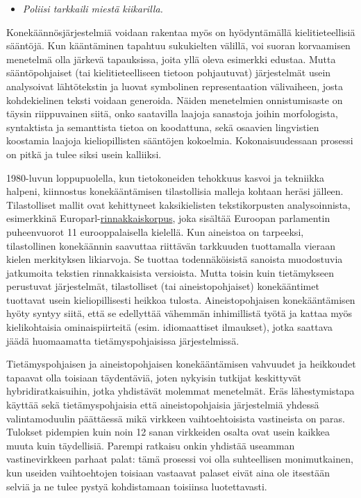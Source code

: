 \documentclass[]{../../metanetpaper}
\begin{document}
\begin{Parallel}[c]{70mm}{70mm}
{\begin{itemize}
\item[] \textit{Poliisi tarkkaili miestä kiikarilla.}
\end{itemize}

Konekäännösjärjestelmiä voidaan rakentaa myös on hyödyntämällä
kielitieteellisiä sääntöjä. Kun kääntäminen tapahtuu sukukielten
välillä, voi suoran korvaamisen menetelmä olla järkevä tapauksissa,
joita yllä oleva esimerkki edustaa. Mutta sääntöpohjaiset (tai
kielitieteelliseen tietoon pohjautuvat) järjestelmät usein analysoivat
lähtötekstin ja luovat symbolinen representaation välivaiheen, josta
kohdekielinen teksti voidaan generoida.  Näiden menetelmien
onnistumisaste on täysin riippuvainen siitä, onko saatavilla laajoja
sanastoja joihin morfologista, syntaktista ja semanttista tietoa on
koodattuna, sekä osaavien lingvistien koostamia laajoja
kieliopillisten sääntöjen kokoelmia. Kokonaisuudessaan prosessi on
pitkä ja tulee siksi usein kalliiksi.

1980-luvun loppupuolella, kun tietokoneiden tehokkuus kasvoi ja
tekniikka halpeni, kiinnostus konekääntämisen tilastollisia malleja
kohtaan heräsi jälleen. Tilastolliset mallit ovat kehittyneet
kaksikielisten tekstikorpusten analysoinnista, esimerkkinä
Europarl-\underline{rinnakkaiskorpus}, joka sisältää Euroopan parlamentin
puheenvuorot 11 eurooppalaisella kielellä. Kun aineistoa on tarpeeksi,
tilastollinen konekäännin saavuttaa riittävän tarkkuuden tuottamalla
vieraan kielen merkityksen likiarvoja. Se tuottaa todennäköisistä
sanoista muodostuvia jatkumoita tekstien rinnakkaisista
versioista. Mutta toisin kuin tietämykseen perustuvat järjestelmät,
tilastolliset (tai aineistopohjaiset) konekääntimet tuottavat usein
kieliopillisesti heikkoa tulosta.  Aineistopohjaisen konekääntämisen
hyöty syntyy siitä, että se edellyttää vähemmän inhimillistä työtä ja
kattaa myös kielikohtaisia ominaispiirteitä (esim. idiomaattiset
ilmaukset), jotka saattava jäädä huomaamatta tietämyspohjaisissa
järjestelmissä.




Tietämyspohjaisen ja aineistopohjaisen konekääntämisen vahvuudet ja
heikkoudet tapaavat olla toisiaan täydentäviä, joten nykyisin tutkijat
keskittyvät hybridiratkaisuihin, jotka yhdistävät molemmat
menetelmät. Eräs lähestymistapa käyttää sekä tietämyspohjaisia että
aineistopohjaisia järjestelmiä yhdessä valintamoduulin päättäessä mikä
virkkeen vaihtoehtoisista vastineista on paras.  Tulokset pidempien
kuin noin 12 sanan virkkeiden osalta ovat usein kaikkea muuta kuin
täydellisiä. Parempi ratkaisu onkin yhdistää useamman vastinevirkkeen
parhaat palat: tämä prosessi voi olla suhteellisen monimutkainen, kun
useiden vaihtoehtojen toisiaan vastaavat palaset eivät aina ole
itsestään selviä ja ne tulee pystyä kohdistamaan toisiinsa
luotettavasti.

}
\end{Parallel}
\end{document}
